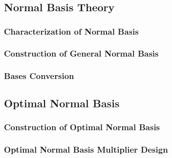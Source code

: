 \appendix
\chapter{}
\fixchapterheading
\section{Normal Basis Theory}
\label{append:NB}
\subsection{Characterization of Normal Basis}
\subsection{Construction of General Normal Basis}
\subsection{Bases Conversion}

\section{Optimal Normal Basis}
\label{append:ONB}
\subsection{Construction of Optimal Normal Basis}
\subsection{Optimal Normal Basis Multiplier Design}
